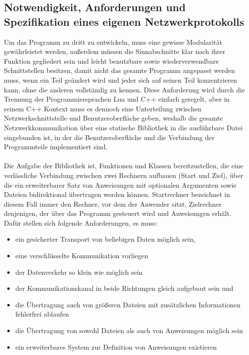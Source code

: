 \subsection{Notwendigkeit, Anforderungen und Spezifikation eines eigenen Netzwerkprotokolls}
Um das Programm zu dritt zu entwickeln, muss eine gewisse Modularität gewährleistet werden, außerdem müssen die Sinnabschnitte klar nach ihrer Funktion gegliedert sein und leicht benutzbare sowie wiederverwendbare Schnittstellen besitzen, damit nicht das gesamte Programm angepasst werden muss, wenn ein Teil geändert wird und jeder sich auf seinen Teil konzentrieren kann, ohne die anderen vollständig zu kennen.
Diese Anforderung wird durch die Trennung der Programmiersprachen Lua und C++ einfach geregelt, aber in reinem C++ Kontext muss es dennoch eine Unterteilung zwischen Netzwerkschnittstelle und Benutzeroberfläche geben, weshalb die gesamte Netzwerkkommunikation über eine statische Bibliothek in die ausführbare Datei eingebunden ist, in der die Benutzeroberfläche und die Verbindung der Programmteile implementiert sind.\\\\
Die Aufgabe der Bibliothek ist, Funktionen und Klassen bereitzustellen, die eine verlässliche Verbindung zwischen zwei Rechnern aufbauen (Start und Ziel), über die ein erweiterbarer Satz von Anweisungen mit optionalen Argumenten sowie Dateien bidirektional übertragen werden können.
Startrechner bezeichnet in diesem Fall immer den Rechner, vor dem der Anwender sitzt, Zielrechner denjenigen, der über das Programm gesteuert wird und Anweisungen erhält.\\
Dafür stellen sich folgende Anforderungen, es muss:\\

\begin{itemize}
\item ein gesicherter Transport von beliebigen Daten möglich sein,
\item eine verschlüsselte Kommunikation vorliegen
\item der Datenverkehr so klein wie möglich sein
\item der Kommunikationskanal in beide Richtungen gleich aufgebaut sein und
\item die Übertragung auch von größeren Dateien mit zusätzlichen Informationen fehlerfrei ablaufen
\item die Übertragung von sowohl Dateien als auch von Anweisungen möglich sein
\item ein erweiterbares System zur Definition von Anweisungen existieren
\end{itemize}

